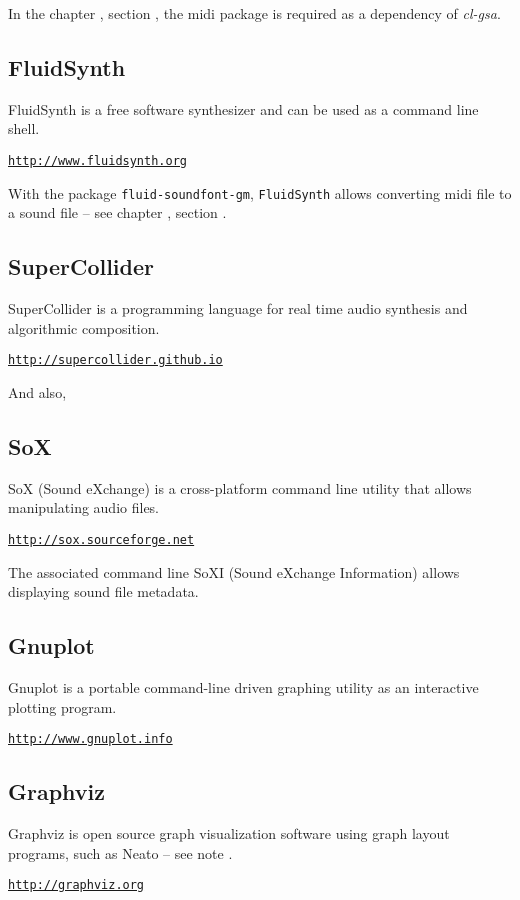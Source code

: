 \bigskip

In the chapter \textsl{}, section \textsl{}, the midi package is required as a dependency of \textsl{cl-gsa}.

\subsection*{FluidSynth}

FluidSynth is a free software synthesizer and can be used as a command line shell.

\href{http://www.fluidsynth.org}{\texttt{\small http://www.fluidsynth.org}}

\bigskip

With the package \texttt{fluid-soundfont-gm}, \texttt{FluidSynth} allows converting midi file to a sound file -- see chapter \textsl{}, section \textsl{}.

\subsection*{SuperCollider}

SuperCollider is a programming language for real time audio synthesis and algorithmic composition.

\href{http://supercollider.github.io}{\texttt{\small http://supercollider.github.io}}

\bigskip

\noindent And also,

\subsection*{SoX}

SoX (Sound eXchange) is a cross-platform command line utility that allows manipulating audio files.

\href{http://sox.sourceforge.net}{\texttt{\small http://sox.sourceforge.net}}

\bigskip

The associated command line SoXI (Sound eXchange Information) allows displaying sound file metadata.

\subsection*{Gnuplot}

Gnuplot is a portable command-line driven graphing utility as an interactive plotting program.

\href{http://www.gnuplot.info}{\texttt{\small http://www.gnuplot.info}}

\subsection*{Graphviz}

Graphviz is open source graph visualization software using graph layout programs, such as Neato -- see note .

\href{http://graphviz.org}{\small{\texttt{http://graphviz.org}}}